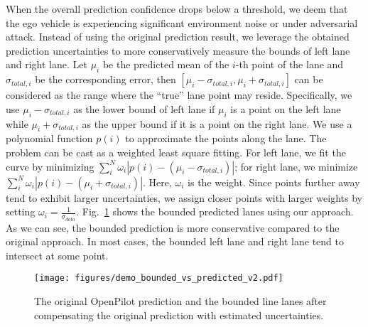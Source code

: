 When the overall prediction confidence drops below a threshold, we deem that the ego vehicle is experiencing significant environment noise or under adversarial attack. Instead of using the original prediction result, we leverage the obtained prediction uncertainties to more conservatively measure the bounds of left lane and right lane. Let $\mu_{i}$ be the predicted mean of the $i$-th point of the lane and $\sigma_{total,i}$ be the corresponding error, then $[\mu_{i}-\sigma_{total,i},\mu_{i}+\sigma_{total,i}]$ can be considered as the range where the ``true'' lane point may reside. Specifically, we use $\mu_{i}-\sigma_{total,i}$ as the lower bound of left lane if $\mu_{i}$ is a point on the left lane while $\mu_{i}+\sigma_{total,i}$ as the upper bound if it is a point on the right lane. We use a polynomial function $p(i)$ to approximate the points along the lane. The problem can be cast as a weighted least square fitting. For left lane, we fit the curve by minimizing $\sum_{i}^{N}\omega_{i}|p(i)-(\mu_{i}-\sigma_{total,i})|$; for right lane, we minimize $\sum_{i}^{N}\omega_{i}|p(i)-(\mu_{i}+\sigma_{total,i})|$. Here, $\omega_{i}$ is the weight. Since points further away tend to exhibit larger uncertainties, we assign closer points with larger weights by setting $\omega_{i} = \frac{1}{\sigma_{data}}$. Fig.~\ref{fig:demo_bound_predict} shows the bounded predicted lanes using our approach. As we can see, the bounded prediction is more conservative compared to the original approach. In most cases, the bounded left lane and right lane tend to intersect at some point. 
\begin{figure}[!ht]
    \centering
    \texttt{[image: figures/demo\_bounded\_vs\_predicted\_v2.pdf]}
    \caption{The original OpenPilot prediction and the bounded line lanes after compensating the original prediction with estimated uncertainties. %
    }
    \label{fig:demo_bound_predict}
\end{figure}

